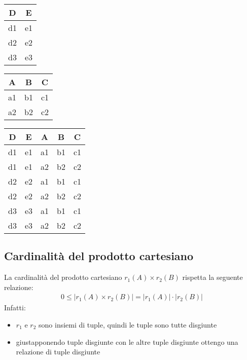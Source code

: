     \begin{center}\begin{tabular}{|c|c|}\hline
        \textbf{D} & \textbf{E} \\ \hline
        d1 & e1 \\ \hline
        d2 & e2 \\ \hline
        d3 & e3 \\ \hline
    \end{tabular}\quad
    \begin{tabular}{|c|c|c|}\hline
        \textbf{A} & \textbf{B} & \textbf{C} \\ \hline
        a1 & b1 & c1 \\ \hline
        a2 & b2 & c2 \\ \hline
    \end{tabular} \quad
    \begin{tabular}{|c|c|c|c|c|}\hline
        \textbf{D} & \textbf{E} &
        \textbf{A} & \textbf{B} & \textbf{C} \\ \hline
        d1 & e1 & a1 & b1 & c1  \\ \hline
        d1 & e1 & a2 & b2 & c2  \\ \hline
        d2 & e2 & a1 & b1 & c1  \\ \hline
        d2 & e2 & a2 & b2 & c2  \\ \hline
        d3 & e3 & a1 & b1 & c1  \\ \hline
        d3 & e3 & a2 & b2 & c2  \\ \hline
    \end{tabular}\end{center}
    
\subsection{Cardinalità del prodotto cartesiano}
La cardinalità del prodotto cartesiano $r_1(A) \times r_2(B)$ rispetta la seguente relazione:
    \begin{equation}\begin{aligned}
        0 \leq |r_1(A) \times r_2(B)| = |r_1(A)| \cdot |r_2(B)|
    \end{aligned}\end{equation}
Infatti: 
    \begin{itemize}
        \item{$r_1$ e $r_2$ sono insiemi di tuple, quindi le tuple sono tutte disgiunte}
        \item{giustapponendo tuple disgiunte con le altre tuple disgiunte ottengo una relazione di tuple disgiunte}
    \end{itemize}

